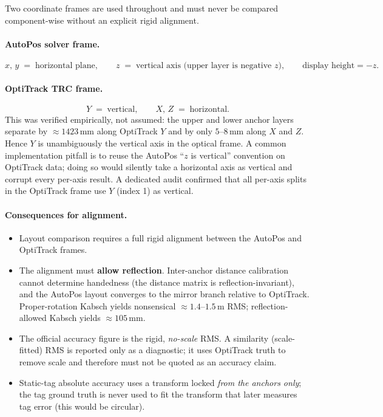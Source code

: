 \documentclass[11pt,a4paper]{article}
\newcommand{\mm}{\,\si{\milli\meter}}
\begin{document}
Two coordinate frames are used throughout and must never be compared component-wise without
an explicit rigid alignment.

\paragraph{AutoPos solver frame.}
\[
  x,\,y \;=\; \text{horizontal plane}, \qquad
  z \;=\; \text{vertical axis (upper layer is negative $z$)}, \qquad
  \text{display height} = -z.
\]

\paragraph{OptiTrack TRC frame.}
\[
  Y \;=\; \text{vertical}, \qquad X,\,Z \;=\; \text{horizontal}.
\]
This was verified empirically, not assumed: the upper and lower anchor layers separate by
$\approx\!1423\mm$ along OptiTrack $Y$ and by only $5$--$8\mm$ along $X$ and $Z$. Hence
$Y$ is unambiguously the vertical axis in the optical frame. A common implementation pitfall
is to reuse the AutoPos ``$z$ is vertical'' convention on OptiTrack data; doing so would
silently take a horizontal axis as vertical and corrupt every per-axis result. A dedicated
audit confirmed that all per-axis splits in the OptiTrack frame use $Y$ (index 1) as
vertical.

\paragraph{Consequences for alignment.}
\begin{itemize}[leftmargin=1.4em]
  \item Layout comparison requires a full rigid alignment between the AutoPos and OptiTrack
        frames.
  \item The alignment must \textbf{allow reflection}. Inter-anchor distance calibration
        cannot determine handedness (the distance matrix is reflection-invariant), and the
        AutoPos layout converges to the mirror branch relative to OptiTrack. Proper-rotation
        Kabsch yields nonsensical $\approx\!1.4$--$1.5\,\si{\meter}$ RMS; reflection-allowed
        Kabsch yields $\approx\!105\mm$.
  \item The official accuracy figure is the rigid, \emph{no-scale} RMS. A similarity
        (scale-fitted) RMS is reported only as a diagnostic; it uses OptiTrack truth to
        remove scale and therefore must not be quoted as an accuracy claim.
  \item Static-tag absolute accuracy uses a transform locked \emph{from the anchors only};
        the tag ground truth is never used to fit the transform that later measures tag
        error (this would be circular).
\end{itemize}
\end{document}
